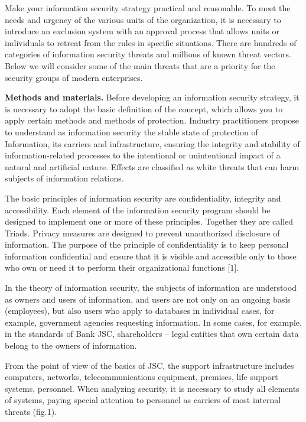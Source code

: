 Make your information security strategy practical and reasonable. To
meet the needs and urgency of the various units of the organization, it
is necessary to introduce an exclusion system with an approval process
that allows units or individuals to retreat from the rules in specific
situations. There are hundreds of categories of information security
threats and millions of known threat vectors. Below we will consider
some of the main threats that are a priority for the security groups of
modern enterprises.

\textbf{Methods and materials.} Before developing an information
security strategy, it is necessary to adopt the basic definition of the
concept, which allows you to apply certain methods and methods of
protection. Industry practitioners propose to understand as information
security the stable state of protection of Information, its carriers and
infrastructure, ensuring the integrity and stability of
information-related processes to the intentional or unintentional impact
of a natural and artificial nature. Effects are classified as white
threats that can harm subjects of information relations.

The basic principles of information security are confidentiality,
integrity and accessibility. Each element of the information security
program should be designed to implement one or more of these principles.
Together they are called Triads. Privacy measures are designed to
prevent unauthorized disclosure of information. The purpose of the
principle of confidentiality is to keep personal information
confidential and ensure that it is visible and accessible only to those
who own or need it to perform their organizational functions {[}1{]}.

In the theory of information security, the subjects of information are
understood as owners and users of information, and users are not only on
an ongoing basis (employees), but also users who apply to databases in
individual cases, for example, government agencies requesting
information. In some cases, for example, in the standards of Bank JSC,
shareholders -- legal entities that own certain data belong to the
owners of information.

From the point of view of the basics of JSC, the support infrastructure
includes computers, networks, telecommunications equipment, premises,
life support systems, personnel. When analyzing security, it is
necessary to study all elements of systems, paying special attention to
personnel as carriers of most internal threats (fig.1).

